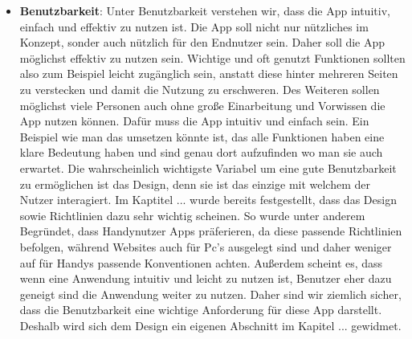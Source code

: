 \begin{itemize}
	\item \textbf{Benutzbarkeit}: Unter Benutzbarkeit verstehen wir, dass die App intuitiv, einfach und effektiv zu nutzen ist. \newline%
	Die App soll nicht nur nützliches im Konzept, sonder auch nützlich für den Endnutzer sein. Daher soll die App möglichst effektiv zu nutzen sein. Wichtige und oft genutzt Funktionen sollten also zum Beispiel leicht zugänglich sein, anstatt diese hinter mehreren Seiten zu verstecken und damit die Nutzung zu erschweren. \newline%
	Des Weiteren sollen möglichst viele Personen auch ohne große Einarbeitung und Vorwissen die App nutzen können. Dafür muss die App intuitiv und einfach sein. Ein Beispiel wie man das umsetzen könnte ist, das alle Funktionen haben eine klare Bedeutung haben und sind genau dort aufzufinden wo man sie auch erwartet. \newline%
	Die wahrscheinlich wichtigste Variabel um eine gute Benutzbarkeit zu ermöglichen ist das Design, denn sie ist das einzige mit welchem der Nutzer interagiert.\newline%
	Im Kaptitel ... wurde bereits festgestellt, dass das Design sowie Richtlinien dazu sehr wichtig scheinen. So wurde unter anderem Begründet, dass Handynutzer Apps präferieren\cite{pcVsphone_mobileAppVsWebTimeSpent}, da diese passende Richtlinien befolgen, während Websites auch für Pc's ausgelegt sind und daher weniger auf für Handys passende Konventionen achten. Außerdem scheint es, dass wenn eine Anwendung intuitiv und leicht zu nutzen ist, Benutzer eher dazu geneigt sind die Anwendung weiter zu nutzen\cite{pcVsphone_peopleWillRevisitMobileIfEasyToUse}.\newline%
	Daher sind wir ziemlich sicher, dass die Benutzbarkeit eine wichtige Anforderung für diese App darstellt. Deshalb wird sich dem Design ein eigenen Abschnitt im Kapitel ... gewidmet.

\end{itemize}
